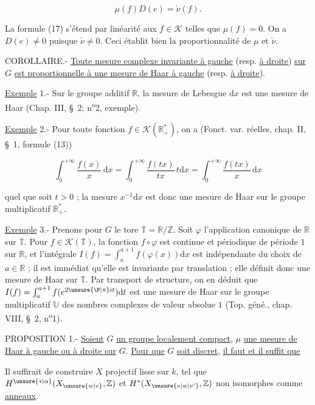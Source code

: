 \[
\mu(f)D(e)=\check{\nu}(f). \tag*{(17)}
\]

La formule (17) s'étend par linéarité aux $f\in\mathcal{K}$ telles que $\mu(f)=0$. On a $D(e)\ne0$ puisque $\check{\nu}\ne0$. Ceci établit bien la proportionnalité de $\mu$ et $\check{\nu}$.

COROLLAIRE.- \uline{Toute mesure complexe invariante à gauche} (resp. \uline{à droite}) \uline{sur} $G$ \uline{est proportionnelle à une mesure de Haar à gauche} (resp. \uline{à droite}).

\uline{Exemple} 1.- Sur le groupe additif $\mathbb{R}$, la mesure de Lebesgue $\mathrm{d}x$ est une mesure de Haar (Chap. III, \S\ 2; n\textsuperscript{o}2, exemple).

\uline{Exemple} 2.- Pour toute fonction $f\in\mathcal{K}(\mathbb{R}_+^*)$, on a (Fonct. var. réelles, chap. II, \S\ 1, formule (13))

\[
\int_0^{+\infty}\frac{f(x)}{x}\,\mathrm{d}x
=\int_0^{+\infty}\frac{f(tx)}{tx}\,t\mathrm{d}x
=\int_0^{+\infty}\frac{f(tx)}{x}\,\mathrm{d}x
\]

quel que soit $t>0$ ; la mesure $x^{-1}\mathrm{d}x$ est donc une mesure de Haar sur le groupe multiplicatif $\mathbb{R}_+^*$.

\uline{Exemple} 3.- Prenons pour $G$ le tore $\mathbb{T}=\mathbb{R}/\mathbb{Z}$. Soit $\varphi$ l'application canonique de $\mathbb{R}$ sur $\mathbb{T}$. Pour $f\in\mathcal{K}(\mathbb{T})$, la fonction $f\circ\varphi$ est continue et périodique de période $1$ sur $\mathbb{R}$, et l'intégrale $I(f)=\int_a^{a+1}f(\varphi(x))\mathrm{d}x$ est indépendante du choix de $a\in\mathbb{R}$ ; il est immédiat qu'elle est invariante par translation ; elle définit donc une mesure de Haar sur $\mathbb{T}$. Par transport de structure, on en déduit que $I(f)=\int_a^{a+1}f(e^{2\unsure{\text{\P}|\pi}it})\mathrm{d}t$ est une mesure de Haar sur le groupe multiplicatif $\mathbb{U}$ des nombres complexes de valeur absolue $1$ (Top. géné., chap. VIII, \S\ 2, n\textsuperscript{o}1).

PROPOSITION 1.- \uline{Soient} $G$ \uline{un groupe localement compact}, $\mu$ \uline{une mesure de Haar à gauche ou à droite sur} $G$. \uline{Pour que} $G$ \uline{soit discret}, \uline{il faut et il suffit que}

Il suffirait de construire $X$ projectif lisse sur $k$, tel que $H^{\unsure{*|\alpha}}(X_{\unsure{w|v}},\mathbb{Z})$ et $H^*(X_{\unsure{v|w|v'}},\mathbb{Z})$ non isomorphes comme \uline{anneaux}.

